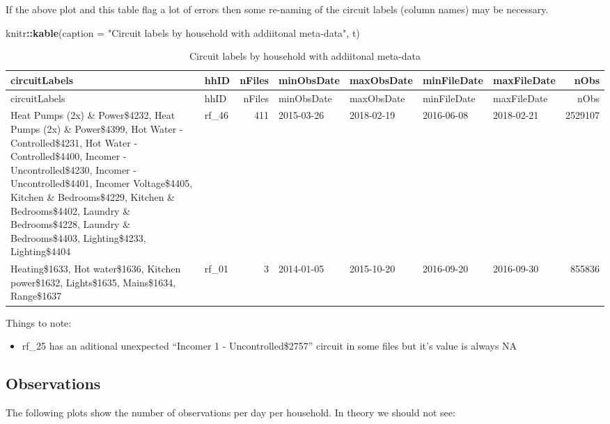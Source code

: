 \documentclass[]{article}
\newenvironment{Shaded}{\begin{snugshade}}{\end{snugshade}}
\newcommand{\KeywordTok}[1]{\textcolor[rgb]{0.13,0.29,0.53}{\textbf{#1}}}
\newcommand{\DataTypeTok}[1]{\textcolor[rgb]{0.13,0.29,0.53}{#1}}
\newcommand{\StringTok}[1]{\textcolor[rgb]{0.31,0.60,0.02}{#1}}
\newcommand{\OperatorTok}[1]{\textcolor[rgb]{0.81,0.36,0.00}{\textbf{#1}}}
\newcommand{\NormalTok}[1]{#1}
\providecommand{\tightlist}{%
  \setlength{\itemsep}{0pt}\setlength{\parskip}{0pt}}
\begin{document}
If the above plot and this table flag a lot of errors then some
re-naming of the circuit labels (column names) may be necessary.

\begin{Shaded}
\begin{Highlighting}[]
\NormalTok{knitr}\OperatorTok{::}\KeywordTok{kable}\NormalTok{(}\DataTypeTok{caption =} \StringTok{"Circuit labels by household with addiitonal meta-data"}\NormalTok{, t)}
\end{Highlighting}
\end{Shaded}

\begin{longtable}[]{@{}llrllllr@{}}
\caption{Circuit labels by household with addiitonal
meta-data}\tabularnewline
\toprule
circuitLabels & hhID & nFiles & minObsDate & maxObsDate & minFileDate &
maxFileDate & nObs\tabularnewline
\midrule
\endfirsthead
\toprule
circuitLabels & hhID & nFiles & minObsDate & maxObsDate & minFileDate &
maxFileDate & nObs\tabularnewline
\midrule
\endhead
Heat Pumps (2x) \& Power\$4232, Heat Pumps (2x) \& Power\$4399, Hot
Water - Controlled\$4231, Hot Water - Controlled\$4400, Incomer -
Uncontrolled\$4230, Incomer - Uncontrolled\$4401, Incomer Voltage\$4405,
Kitchen \& Bedrooms\$4229, Kitchen \& Bedrooms\$4402, Laundry \&
Bedrooms\$4228, Laundry \& Bedrooms\$4403, Lighting\$4233,
Lighting\$4404 & rf\_46 & 411 & 2015-03-26 & 2018-02-19 & 2016-06-08 &
2018-02-21 & 2529107\tabularnewline
Heating\$1633, Hot water\$1636, Kitchen power\$1632, Lights\$1635,
Mains\$1634, Range\$1637 & rf\_01 & 3 & 2014-01-05 & 2015-10-20 &
2016-09-20 & 2016-09-30 & 855836\tabularnewline
\bottomrule
\end{longtable}

Things to note:

\begin{itemize}
\tightlist
\item
  rf\_25 has an aditional unexpected ``Incomer 1 - Uncontrolled\$2757''
  circuit in some files but it's value is always NA
\end{itemize}

\subsection{Observations}\label{observations}

The following plots show the number of observations per day per
household. In theory we should not see:
\end{document}
